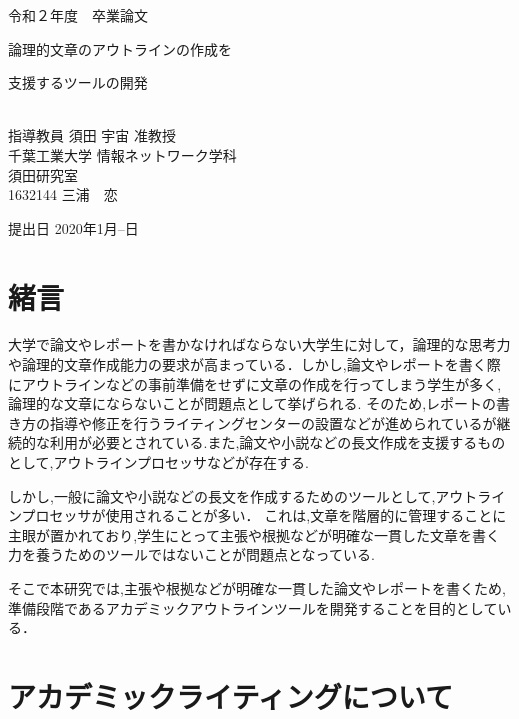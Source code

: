 \documentclass[a4j,12pt]{jarticle}
\begin{document}
\begin{center}
\thispagestyle{empty}
\vspace*{5zh}
\huge
令和２年度　卒業論文\\[50pt]
{\Huge 論理的文章のアウトラインの作成を

支援するツールの開発}\\
[80pt]
\huge
指導教員 須田 宇宙 准教授\\[30pt]
千葉工業大学 情報ネットワーク学科\\[10pt]
須田研究室\\[60pt]
1632144 \hspace{70pt} 三浦　恋\\[75pt]
\end{center}
\vspace*{-2cm}
\begin{flushright} 
\huge
提出日 2020年1月--日
\end{flushright}

\newpage
{}
\tableofcontents%
\newpage
{}
\section{緒言}

大学で論文やレポートを書かなければならない大学生に対して，論理的な思考力や論理的文章作成能力の要求が高まっている．しかし,論文やレポートを書く際にアウトラインなどの事前準備をせずに文章の作成を行ってしまう学生が多く,論理的な文章にならないことが問題点として挙げられる.
そのため,レポートの書き方の指導や修正を行うライティングセンターの設置などが進められているが継続的な利用が必要とされている.また,論文や小説などの長文作成を支援するものとして,アウトラインプロセッサなどが存在する.

しかし,一般に論文や小説などの長文を作成するためのツールとして,アウトラインプロセッサが使用されることが多い．
これは,文章を階層的に管理することに主眼が置かれており,学生にとって主張や根拠などが明確な一貫した文章を書く力を養うためのツールではないことが問題点となっている.

そこで本研究では,主張や根拠などが明確な一貫した論文やレポートを書くため,準備段階であるアカデミックアウトラインツールを開発することを目的としている．
\newpage
\section{アカデミックライティングについて}
\end{document}
